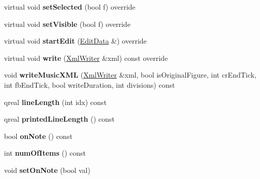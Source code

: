 \begin{DoxyCompactItemize}
virtual void {\bfseries set\+Selected} (bool f) override
\item 
\mbox{\label{class_ms_1_1_figured_bass_a4e24d95c6388424416c52b0d64d3276a}} 
virtual void {\bfseries set\+Visible} (bool f) override
\item 
\mbox{\label{class_ms_1_1_figured_bass_a98672f5d74a2fdfa4906550c5e9b2fbb}} 
virtual void {\bfseries start\+Edit} (\hyperlink{class_ms_1_1_edit_data}{Edit\+Data} \&) override
\item 
\mbox{\label{class_ms_1_1_figured_bass_a86a1a6fc08724044e95d8acee5a21677}} 
virtual void {\bfseries write} (\hyperlink{class_ms_1_1_xml_writer}{Xml\+Writer} \&xml) const override
\item 
\mbox{\label{class_ms_1_1_figured_bass_a56f05df975787edf1f459e45ff85a2e4}} 
void {\bfseries write\+Music\+X\+ML} (\hyperlink{class_ms_1_1_xml_writer}{Xml\+Writer} \&xml, bool is\+Original\+Figure, int cr\+End\+Tick, int fb\+End\+Tick, bool write\+Duration, int divisions) const
\item 
\mbox{\label{class_ms_1_1_figured_bass_ae068cc1807a29195b6766c0debc88976}} 
qreal {\bfseries line\+Length} (int idx) const
\item 
\mbox{\label{class_ms_1_1_figured_bass_a5e50b8a2d009e0bcab656576c59e3ffc}} 
qreal {\bfseries printed\+Line\+Length} () const
\item 
\mbox{\label{class_ms_1_1_figured_bass_a87ea18fe23b84cff204d206bac2c05e4}} 
bool {\bfseries on\+Note} () const
\item 
\mbox{\label{class_ms_1_1_figured_bass_a4f28cecfe512d32d0a9d1cedc2a10b87}} 
int {\bfseries num\+Of\+Items} () const
\item 
\mbox{\label{class_ms_1_1_figured_bass_ab8eb561972ecb875ffe96f14efe6ef1b}} 
void {\bfseries set\+On\+Note} (bool val)
\item 
\mbox{\label{class_ms_1_1_figured_bass_a82cdf8a1f5f4d1d1481aae5c5ae88b1b}} 

\end{DoxyCompactItemize}
